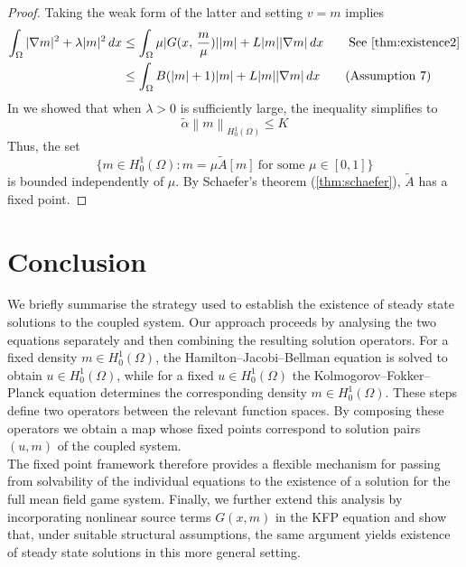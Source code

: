 \documentclass[11pt]{article}
\numberwithin{equation}{section}
\theoremstyle{definition}
\theoremstyle{remark}
\newcommand{\Honez}{H_0^1(\Omega)}
\newcommand{\norm}[1]{\left\lVert #1 \right\rVert}
\begin{document}
\begin{proof}
  Taking the weak form of the latter and setting $v=m$ implies
  \begin{align*}
  \int_\Omega |\nabla m|^2 + \lambda |m|^2\,dx
  &\le \int_\Omega \mu|G(x,\,\frac{m}{\mu})||m| + L|m||\nabla m|\,dx \qquad \text{See \Cref{thm:existence2}}\\
  &\le \int_\Omega B(|m|+1)|m| + L|m||\nabla m|\,dx \qquad \text{(Assumption 7)}\\
  \end{align*}
  In  we showed that when $\lambda>0$ is sufficiently large, the inequality simplifies to 
  \[\tilde{\alpha} \norm{m}_{\Honez} \le K\]
  Thus, the set 
  \[\{m\in\Honez: m=\mu \tilde{A}[m]\ \text{for some }\mu\in[0,1]\}\]
  is bounded independently of $\mu$. 
  By Schaefer's theorem (\ref{thm:schaefer}), $\tilde{A}$ has a fixed point.
\end{proof}

\section{Conclusion}
We briefly summarise the strategy used to establish the existence of steady state solutions to the coupled system. 
Our approach proceeds by analysing the two equations separately and then combining the resulting solution operators. 
For a fixed density $m \in \Honez$, the Hamilton--Jacobi--Bellman equation is solved to obtain $u \in \Honez$, 
while for a fixed $u \in \Honez$ the Kolmogorov--Fokker--Planck equation determines the corresponding density $m \in \Honez$. 
These steps define two operators between the relevant function spaces. 
By composing these operators we obtain a map whose fixed points correspond to solution pairs $(u,m)$ of the coupled system.\\

The fixed point framework therefore provides a flexible mechanism for 
passing from solvability of the individual equations to the existence of a solution for the full mean field game system. 
Finally, we further extend this analysis by incorporating nonlinear source terms $G(x,m)$ in the KFP equation and show that, 
under suitable structural assumptions, the same argument yields existence of steady state solutions in this more general setting.



\end{document}
